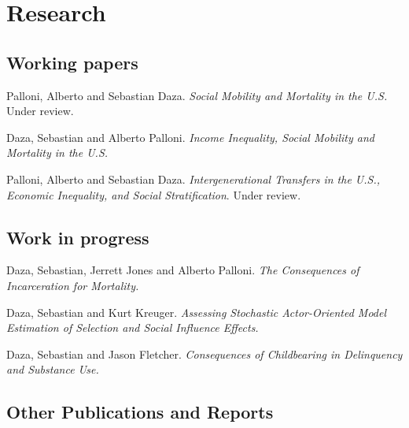 \documentclass[10pt,letterpaper]{article}
\renewenvironment{itemize}{
  \begin{list}{}{
    \setlength{\leftmargin}{1.5em}
    \setlength{\itemsep}{0.25em}
    \setlength{\parskip}{0pt}
    \setlength{\parsep}{0.25em}
  }
}{
  \end{list}
}
\begin{document}
\section*{Research}

\subsection*{Working papers}

\begin{itemize}

\item Palloni, Alberto and Sebastian Daza. {\textit{Social Mobility and Mortality in the U.S.}} Under review.

\item Daza, Sebastian and Alberto Palloni. {\textit{Income Inequality, Social Mobility and Mortality in the U.S.}}

\item Palloni, Alberto and Sebastian Daza. {\textit{Intergenerational Transfers in the U.S., Economic Inequality, and Social Stratification}}.
Under review.

\end{itemize}

\subsection*{Work in progress}

\begin{itemize}

\item Daza, Sebastian, Jerrett Jones and Alberto Palloni. {\textit{The Consequences of Incarceration for Mortality.}}

\item Daza, Sebastian and Kurt Kreuger. {\textit{Assessing Stochastic Actor-Oriented Model Estimation of Selection and Social Influence Effects.}}


\item Daza, Sebastian and Jason Fletcher. {\textit{Consequences of Childbearing in Delinquency and Substance Use.}}
\end{itemize}

\subsection*{Other Publications and Reports}
\end{document}
